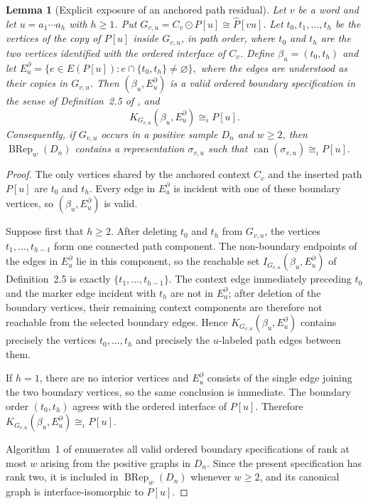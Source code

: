 \documentclass[11pt]{article}
\newtheorem{lemma}[theorem]{Lemma}
\theoremstyle{definition}
\theoremstyle{remark}
\begin{document}
\begin{lemma}[Explicit exposure of an anchored path residual]
\label{lem:block-residual-exposure}
Let \(v\) be a word and let \(u=a_1\cdots a_h\) with \(h\ge1\).  Put
\(G_{v,u}=C_v\odot P[u]\cong\widehat P[vu].\)
Let \(t_0,t_1,\ldots,t_h\) be the vertices of the copy of \(P[u]\) inside
\(G_{v,u}\), in path order, where \(t_0\) and \(t_h\) are the two vertices
identified with the ordered interface of \(C_v\).  Define
\(\beta_u=(t_0,t_h)\)
and let
\(E_u^\partial = \{e\in E(P[u]): e\cap\{t_0,t_h\}\ne\varnothing\},\)
where the edges are understood as their copies in \(G_{v,u}\).  Then
\((\beta_u,E_u^\partial)\) is a valid ordered boundary specification in the
sense of Definition~2.5 of \cite{ShoudaiEtAl2026}, and
\[
\boxed{
K_{G_{v,u}}(\beta_u,E_u^\partial)
\cong_\iota P[u].
}
\]
Consequently, if \(G_{v,u}\) occurs in a positive sample \(D_n\) and
\(w\ge2\), then
\(\operatorname{BRep}_w(D_n)\)
contains a representation \(\sigma_{v,u}\) such that
\(\operatorname{can}(\sigma_{v,u})\cong_\iota P[u].\)
\end{lemma}

\begin{proof}
The only vertices shared by the anchored context \(C_v\) and the inserted
path \(P[u]\) are \(t_0\) and \(t_h\).  Every edge in
\(E_u^\partial\) is incident with one of these boundary vertices, so
\((\beta_u,E_u^\partial)\) is valid.

Suppose first that \(h\ge2\).  After deleting \(t_0\) and \(t_h\) from
\(G_{v,u}\), the vertices \(t_1,\ldots,t_{h-1}\) form one connected path
component.  The non-boundary endpoints of the edges in \(E_u^\partial\) lie
in this component, so the reachable set
\(I_{G_{v,u}}(\beta_u,E_u^\partial)\) of Definition~2.5 is exactly
\(\{t_1,\ldots,t_{h-1}\}.\)
The context edge immediately preceding \(t_0\) and the marker edge incident
with \(t_h\) are not in \(E_u^\partial\); after deletion of the boundary
vertices, their remaining context components are therefore not reachable from
the selected boundary edges.  Hence
\(K_{G_{v,u}}(\beta_u,E_u^\partial)\) contains precisely the vertices
\(t_0,\ldots,t_h\) and precisely the \(u\)-labeled path edges between them.

If \(h=1\), there are no interior vertices and
\(E_u^\partial\) consists of the single edge joining the two boundary
vertices, so the same conclusion is immediate.  The boundary order
\((t_0,t_h)\) agrees with the ordered interface of \(P[u]\).  Therefore
\(K_{G_{v,u}}(\beta_u,E_u^\partial)\cong_\iota P[u].\)

Algorithm~1 of \cite{ShoudaiEtAl2026} enumerates all valid ordered boundary
specifications of rank at most \(w\) arising from the positive graphs in
\(D_n\).  Since the present specification has rank two, it is included in
\(\operatorname{BRep}_w(D_n)\) whenever \(w\ge2\), and its canonical graph is
interface-isomorphic to \(P[u]\).
\end{proof}
\end{document}
